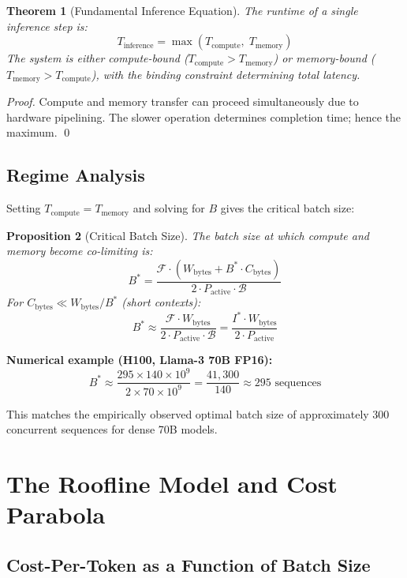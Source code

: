 \documentclass[11pt,a4paper]{article}
\newtheorem{theorem}{Theorem}
\newtheorem{proposition}[theorem]{Proposition}
\newcommand{\Tcomp}{T_{\mathrm{compute}}}
\newcommand{\Tmem}{T_{\mathrm{memory}}}
\newcommand{\BW}{\mathcal{B}}
\newcommand{\FLOPS}{\mathcal{F}}
\begin{document}
\begin{theorem}[Fundamental Inference Equation]
\label{thm:fundamental}
The runtime of a single inference step is:
\[
  \boxed{T_\text{inference} = \max\!\left(\Tcomp,\; \Tmem\right)}
\]
The system is either compute-bound ($\Tcomp > \Tmem$) or memory-bound
($\Tmem > \Tcomp$), with the binding constraint determining total latency.
\end{theorem}

\begin{proof}
Compute and memory transfer can proceed simultaneously due to hardware
pipelining. The slower operation determines completion time; hence the
maximum. \qed
\end{proof}

\subsection{Regime Analysis}

Setting $\Tcomp = \Tmem$ and solving for $B$ gives the critical batch size:

\begin{proposition}[Critical Batch Size]
\label{prop:critical-batch}
The batch size at which compute and memory become co-limiting is:
\[
  B^* = \frac{\FLOPS \cdot (W_\text{bytes} + B^* \cdot C_\text{bytes})}
              {2 \cdot P_\text{active} \cdot \BW}
\]
For $C_\text{bytes} \ll W_\text{bytes}/B^*$ (short contexts):
\[
  B^* \approx \frac{\FLOPS \cdot W_\text{bytes}}
                   {2 \cdot P_\text{active} \cdot \BW}
             = \frac{I^* \cdot W_\text{bytes}}{2 \cdot P_\text{active}}
\]
\end{proposition}

\textbf{Numerical example (H100, Llama-3 70B FP16):}
\[
  B^* \approx \frac{295 \times 140 \times 10^9}{2 \times 70 \times 10^9}
            = \frac{41{,}300}{140} \approx 295 \text{ sequences}
\]

This matches the empirically observed optimal batch size of approximately
300 concurrent sequences for dense 70B models.

\section{The Roofline Model and Cost Parabola}
\label{sec:roofline}

\subsection{Cost-Per-Token as a Function of Batch Size}
\end{document}
